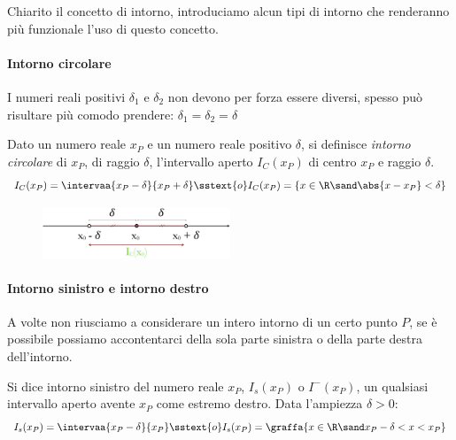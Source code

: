   
Chiarito il concetto di intorno, introduciamo alcun tipi di 
intorno che renderanno più funzionale l'uso di questo concetto. 

\paragraph{Intorno circolare} 
I numeri reali positivi \(\delta_1\) e \(\delta_2\) non devono per forza 
essere diversi, spesso può risultare più comodo prendere:
\(\delta_1 = \delta_2 = \delta\)

\begin{newdef}{}{}
Dato un numero reale \(x_P\) e un numero reale positivo \(\delta\), si 
definisce \emph{intorno circolare} di \(x_P\), di raggio \(\delta\), 
l'intervallo aperto \(I_C(x_P)\) di centro \(x_P\) e raggio \(\delta\).
\[I_C(x_P)= \intervaa{x_P-\delta}{x_P+\delta} \sstext{o} 
  I_C(x_P) = \{x \in \R \sand \abs{x-x_P} < \delta\}\]
\end{newdef}

\begin{figure}[h!]
\centering
\includegraphics[width=0.5\textwidth]{img/top_2.png}%
\end{figure}

\paragraph{Intorno sinistro e intorno destro}
A volte non riusciamo a considerare un intero intorno di un certo punto \(P\),
se è possibile possiamo accontentarci della sola parte sinistra o della parte 
destra dell'intorno.

\begin{newdef}{}{}
Si dice intorno sinistro del numero reale \(x_P\), \(I_s(x_P)\) o 
\(I^-(x_P)\), un qualsiasi intervallo aperto avente \(x_P\) come estremo 
destro. 
Data l'ampiezza \(\delta > 0\):
\[I_s(x_P) = \intervaa{x_P-\delta}{x_P} \sstext{o} 
  I_s(x_P) = \graffa{x \in \R \sand x_P-\delta < x < x_P}\]
\end{newdef}

